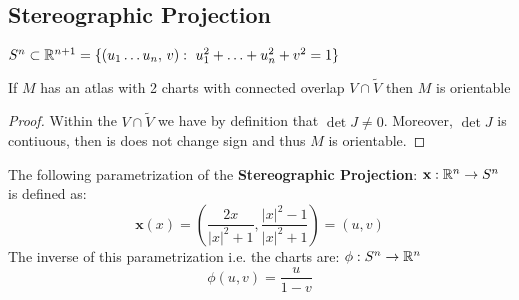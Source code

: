 \subsection{Stereographic Projection }

\begin{ddef}[$S^n$]
$S^n\subset \mathbb{R}^{n+1} =\{ (u_1\ldots u_n,\, v): \ u_1^2 +\ldots + u_n^2 + v^2 =1\}$
\end{ddef}

\begin{teorema}
If $M$ has an atlas with 2 charts with connected overlap $V\cap \tilde V$ then $M$ is orientable
\begin{proof}
Within the $V \cap \tilde V$ we have by definition that $\det J \neq 0$. Moreover, $\det J$ is contiuous, then is does not change sign and thus $M$ is orientable.
\end{proof}
\end{teorema}

The following parametrization of the \textbf{Stereographic Projection}: $\textbf{x}: \mathbb{R}^n \to S^n$ is defined as:
    $$ \textbf{x}(x)= \left( \frac{2x}{|x|^2+1}, \frac{|x|^2-1}{|x|^2+1} \right) = (u,v) $$
The inverse of this parametrization i.e. the charts are: $\phi:S^n\to \mathbb{R}^n$
    $$\phi(u,v)= \frac{u}{1-v}$$
